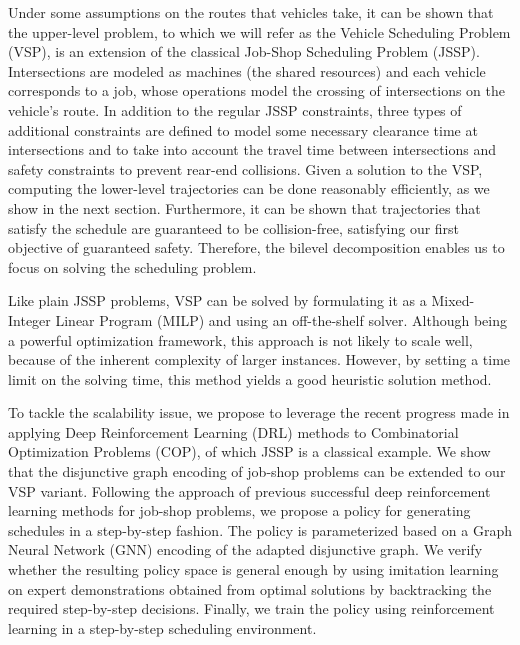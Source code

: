 \documentclass{article}
\theoremstyle{definition}
\theoremstyle{plain}
\begin{document}
Under some assumptions on the routes that vehicles take, it can be shown that
the upper-level problem, to which we will refer as the Vehicle Scheduling
Problem (VSP), is an extension of the classical Job-Shop Scheduling Problem
(JSSP). Intersections are modeled as machines (the shared resources) and each
vehicle corresponds to a job, whose operations model the crossing of
intersections on the vehicle's route.
%
In addition to the regular JSSP constraints, three types of additional
constraints are defined to model some necessary clearance time at intersections
and to take into account the travel time between intersections and safety
constraints to prevent rear-end collisions.
Given a solution to the VSP, computing the lower-level trajectories can be done
reasonably efficiently, as we show in the next section. Furthermore, it can be
shown that trajectories that satisfy the schedule are guaranteed to
be collision-free, satisfying our first objective of guaranteed safety.
Therefore, the bilevel decomposition enables us to focus on solving the
scheduling problem.

Like plain JSSP problems, VSP can be solved by formulating it as a Mixed-Integer
Linear Program (MILP) and using an off-the-shelf solver. Although being a
powerful optimization framework, this approach is not likely to scale well,
because of the inherent complexity of larger instances. However, by setting a
time limit on the solving time, this method yields a good heuristic solution
method.

To tackle the scalability issue, we propose to leverage the recent progress made
in applying Deep Reinforcement Learning (DRL) methods to Combinatorial
Optimization Problems (COP), of which JSSP is a classical example. We show that
the disjunctive graph encoding of job-shop problems can be extended to our VSP
variant. Following the approach of previous successful deep reinforcement
learning methods for job-shop problems, we propose a policy for generating
schedules in a step-by-step fashion. The policy is parameterized based on a
Graph Neural Network (GNN) encoding of the adapted disjunctive graph. We verify
whether the resulting policy space is general enough by using imitation learning
on expert demonstrations obtained from optimal solutions by backtracking the
required step-by-step decisions. Finally, we train the policy using
reinforcement learning in a step-by-step scheduling environment.
\end{document}
